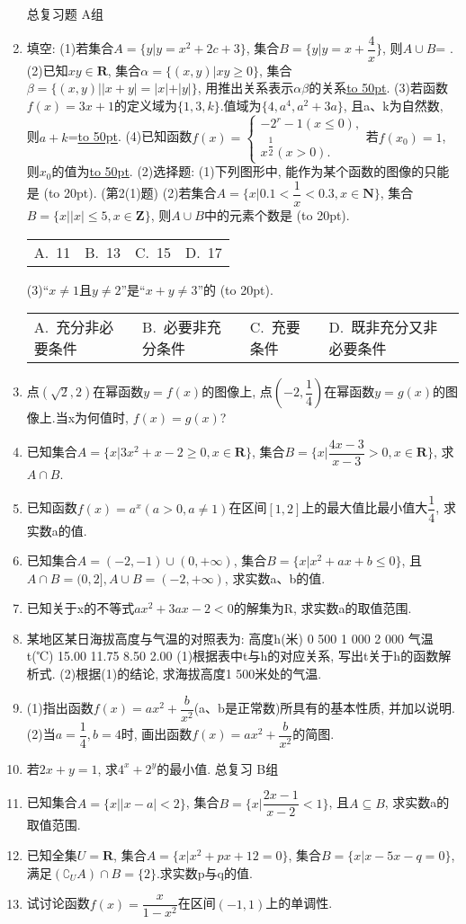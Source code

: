 \documentclass[10pt,a4paper]{article}
\newcommand{\blank}[1]{\underline{\hbox to #1pt{}}}
\newcommand{\bracket}[1]{(\hbox to #1pt{})}
\newcommand{\fourch}[4]{\par\begin{tabular}{p{.23\textwidth}p{.23\textwidth}p{.23\textwidth}p{.23\textwidth}}
A.~#1 &B.~#2& C.~#3& D.~#4
\end{tabular}}
\begin{document}
\begin{enumerate}[1.]
总复习题
A组
\item 填空:
(1)若集合$A=\{y|y=x^2+2c+3\}$, 集合$B=\{y|y=x+\dfrac 4x\}$, 则$A\cup B$=		.
(2)已知$xy\in \mathbf{R}$, 集合$\alpha =\{(x,y)|xy\ge 0\}$, 集合$\beta =\{(x,y)||x+y|=|x|+|y|\}$, 用推出关系表示$\alpha \beta$的关系\blank{50}.
(3)若函数$f(x)=3x+1$的定义域为$\{1,3,k\}$.值域为$\{4,a^4,a^2+3a\}$, 且a、k为自然数, 则$a+k$=\blank{50}.
(4)已知函数$f(x)=\begin{cases} -2^r-1(x\le 0), \\ x^{\dfrac 12}(x>0). \end{cases}$若$f(x_0)=1$, 则$x_0$的值为\blank{50}.
(2)选择题:
(1)下列图形中, 能作为某个函数的图像的只能是						\bracket{20}.
(第2(1)题)
(2)若集合$A=\{x|0.1<\dfrac 1x<0.3,x\in \mathbf{N}\}$, 集合$B=\{x||x|\le 5,x\in \mathbf{Z}\}$, 则$A\cup B$中的元素个数是															\bracket{20}.
\fourch{11}{13}{15}{17}
(3)``$x\ne 1$且$y\ne 2$''是``$x+y\ne 3$''的								\bracket{20}.
\fourch{充分非必要条件}{必要非充分条件}{充要条件}{既非充分又非必要条件}
\item 点$(\sqrt 2,2)$在幂函数$y=f(x)$的图像上, 点$(-2,\dfrac 14)$在幂函数$y=g(x)$的图像上.当x为何值时, $f(x)=g(x)$?
\item 已知集合$A=\{x|3x^2+x-2\ge 0,x\in \mathbf{R}\}$, 集合$B=\{x|\dfrac{4x-3}{x-3}>0,x\in \mathbf{R}\}$, 求$A\cap B$.
\item 已知函数$f(x)=a^x(a>0,a\ne 1)$在区间$[1,2]$上的最大值比最小值大$\dfrac 14$, 求实数a的值.
\item 已知集合$A=(-2,-1)\cup (0,+\infty)$, 集合$B=\{x|x^2+ax+b\le 0\}$, 且$A\cap B=(0,2],A\cup B=(-2,+\infty)$, 求实数a、b的值.
\item 已知关于x的不等式$ax^2+3ax-2<0$的解集为R, 求实数a的取值范围.
\item 某地区某日海拔高度与气温的对照表为:
高度h(米)	0	500	1 000 	2 000
气温t(℃)	15.00	11.75	8.50	2.00
(1)根据表中t与h的对应关系, 写出t关于h的函数解析式.
(2)根据(1)的结论, 求海拔高度1 500米处的气温.
\item (1)指出函数$f(x)=ax^2+\dfrac b{x^2}$(a、b是正常数)所具有的基本性质, 并加以说明.
(2)当$a=\dfrac 14,b=4$时, 画出函数$f(x)=ax^2+\dfrac b{x^2}$的简图.
\item 若$2x+y=1$, 求$4^x+2^y$的最小值.
总复习
B组
\item 已知集合$A=\{x||x-a|<2\}$, 集合$B=\{x|\dfrac{2x-1}{x-2}<1\}$, 且$A\subseteq B$, 求实数a的取值范围.
\item 已知全集$U=\mathbf{R}$, 集合$A=\{x|x^2+px+12=0\}$, 集合$B=\{x|x-5x-q=0\}$, 满足$(\complement _UA)\cap B=\{2\}$.求实数p与q的值.
\item 试讨论函数$f(x)=\dfrac x{1-x^2}$在区间$(-1,1)$上的单调性.

\end{enumerate}
\end{document}
